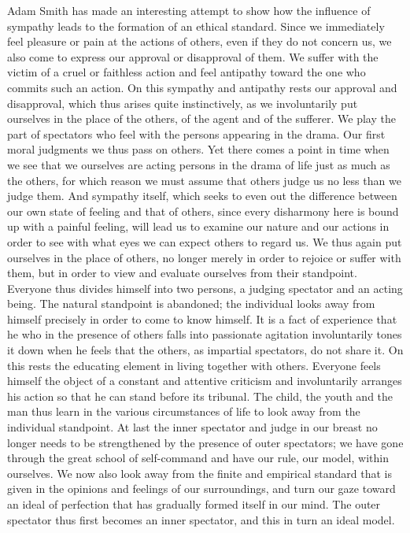 \documentclass[12pt,a4paper,openany]{book}
\newcommand{\opage}[1]{\marginnote{\footnotesize\textit{[#1]}}}
\begin{document}
Adam Smith has made an interesting attempt to show how the influence of
sympathy leads to \opage{40}the formation of an ethical standard. Since we
immediately feel pleasure or pain at the actions of others, even if they do
not concern us, we also come to express our approval or disapproval of them.
We suffer with the victim of a cruel or faithless action and feel antipathy
toward the one who commits such an action. On this sympathy and antipathy
rests our approval and disapproval, which thus arises quite instinctively, as
we involuntarily put ourselves in the place of the others, of the agent and of
the sufferer. We play the part of spectators who feel with the persons
appearing in the drama. Our first moral judgments we thus pass on others. Yet
there comes a point in time when we see that we ourselves are acting persons
in the drama of life just as much as the others, for which reason we must
assume that others judge us no less than we judge them. And sympathy itself,
which seeks to even out the difference between our own state of feeling and
that of others, since every disharmony here is bound up with a painful
feeling, will lead us to examine our nature and our actions in order to see
with what eyes we can expect others to regard us. We thus again put ourselves
in the place of others, no longer merely in order to rejoice or suffer with
them, but in order to view and evaluate ourselves from their standpoint.
Everyone thus divides himself into two persons, a judging spectator and an
acting being. The natural standpoint is abandoned; the individual looks away
from himself precisely in order to come to know himself. It is a fact of
experience that he who in the presence of others falls into passionate
\opage{41}agitation involuntarily tones it down when he feels that the others,
as impartial spectators, do not share it. On this rests the educating element
in living together with others. Everyone feels himself the object of a
constant and attentive criticism and involuntarily arranges his action so that
he can stand before its tribunal. The child, the youth and the man thus learn
in the various circumstances of life to look away from the individual
standpoint. At last the inner spectator and judge in our breast no longer
needs to be strengthened by the presence of outer spectators; we have gone
through the great school of self-command and have our rule, our model, within
ourselves. We now also look away from the finite and empirical standard that
is given in the opinions and feelings of our surroundings, and turn our gaze
toward an ideal of perfection that has gradually formed itself in our mind.
The outer spectator thus first becomes an inner spectator, and this in turn an
ideal model.
\end{document}
